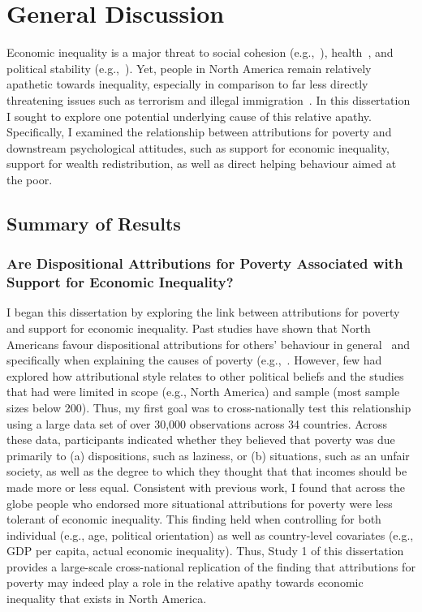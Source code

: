 \documentclass{sfuthesis}
\begin{document}
\chapter{General Discussion}

Economic inequality is a major threat to social cohesion (e.g.,~\cite{kawachi97, lichbach89}), health~\cite{wilkinson06}, and political stability (e.g.,~\cite{murphy01}). Yet, people in North America remain relatively apathetic towards inequality, especially in comparison to far less directly threatening issues such as terrorism and illegal immigration~\cite{mccarthy16}. In this dissertation I sought to explore one potential underlying cause of this relative apathy. Specifically, I examined the relationship between attributions for poverty and downstream psychological attitudes, such as support for economic inequality, support for wealth redistribution, as well as direct helping behaviour aimed at the poor.

\section{Summary of Results}
\subsection{Are Dispositional Attributions for Poverty Associated with Support for Economic Inequality?}

I began this dissertation by exploring the link between attributions for poverty and support for economic inequality. Past studies have shown that North Americans favour dispositional attributions for others’ behaviour in general~\cite{bem72, jones65} and specifically when explaining the causes of poverty (e.g.,~\cite{cozzarelli01, feagin75, feather74, halpern93}. However, few had explored how attributional style relates to other political beliefs and the studies that had were limited in scope (e.g., North America) and sample (most sample sizes below 200). Thus, my first goal was to cross-nationally test this relationship using a large data set of over 30,000 observations across 34 countries. Across these data, participants indicated whether they believed that poverty was due primarily to (a) dispositions, such as laziness, or (b) situations, such as an unfair society, as well as the degree to which they thought that that incomes should be made more or less equal. Consistent with previous work, I found that across the globe people who endorsed more situational attributions for poverty were less tolerant of economic inequality. This finding held when controlling for both individual (e.g., age, political orientation) as well as country-level covariates (e.g., GDP per capita, actual economic inequality). Thus, Study 1 of this dissertation provides a large-scale cross-national replication of the finding that attributions for poverty may indeed play a role in the relative apathy towards economic inequality that exists in North America.
\end{document}
